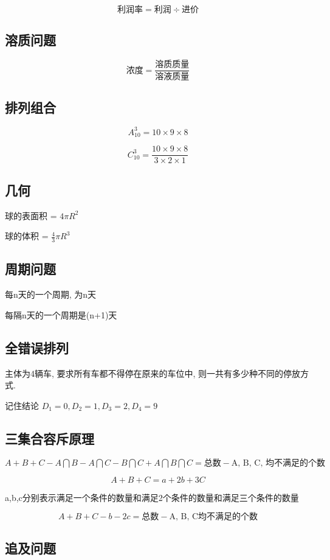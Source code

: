$$
	\mbox{利润率} = \mbox{利润} \div \mbox{进价}
$$

\subsection{溶质问题}
$$
	\mbox{浓度}=\frac{\mbox{溶质质量}}{\mbox{溶液质量}}
$$

\subsection{排列组合}
$$
	A^{3}_{10} = 10 \times 9 \times 8
$$

$$
	C^{3}_{10} = \frac{10 \times 9 \times 8}{3 \times 2 \times 1}
$$

\subsection{几何}

球的表面积 = $4\pi R^2$

球的体积 = $\frac{4}{3} \pi R^3$

\subsection{周期问题}
每n天的一个周期, 为n天

每隔n天的一个周期是(n+1)天




\subsection{全错误排列}

主体为4辆车, 要求所有车都不得停在原来的车位中, 则一共有多少种不同的停放方式.

记住结论 $D_1 = 0, D_2 = 1, D_3 = 2, D_4 = 9$


\subsection{三集合容斥原理}

$A + B + C - A\bigcap B - A \bigcap C - B \bigcap C + A \bigcap B \bigcap C = \mbox{总数} - \mbox{A, B, C, 均不满足的个数} $

$$A + B + C = a + 2b + 3C$$

a,b,c分别表示满足一个条件的数量和满足2个条件的数量和满足三个条件的数量

$$
	A + B + C - b - 2c = \mbox{总数} - \mbox{A, B, C均不满足的个数}
$$


\subsection{追及问题}

